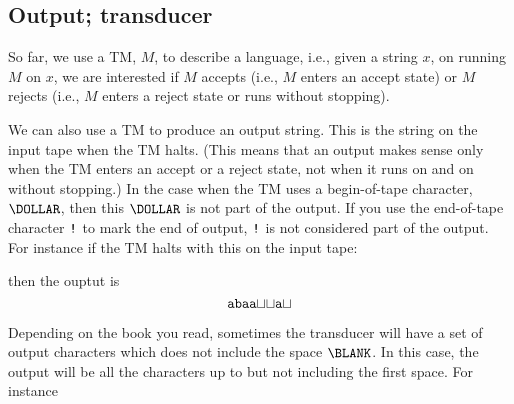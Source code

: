 \newpage
\subsection{Output; transducer}

So far, we use a TM, $M$, to describe a language, i.e.,
given a string $x$, on running $M$ on $x$, we are interested if
$M$ accepts (i.e., $M$ enters an accept state)
or $M$ rejects (i.e., $M$ enters a reject state or runs without stopping).

We can also use a TM to produce an output string.
This is the string on the input tape when the TM halts.
(This means that an output makes sense only when the TM enters an accept
or a reject state, not when it runs on and on without stopping.)
In the case when the TM uses a begin-of-tape character, $\DOLLAR$,
then this $\DOLLAR$ is not part of the output.
If you use the end-of-tape character $\operatorname{\text{\texttt{!}}}$
to mark the end of output, $\operatorname{\text{\texttt{!}}}$ is not considered part of the output.
For instance if the TM halts with this on the input tape:


then the ouptut is
\[
\text{\texttt{abaa}$\sqcup\sqcup$\texttt{a}$\sqcup$}
\]


Depending on the book you read,
sometimes the transducer will have a set of output characters which does not
include the space $\BLANK$.
In this case, the output will be all the characters up to but not including
the first space.
For instance


